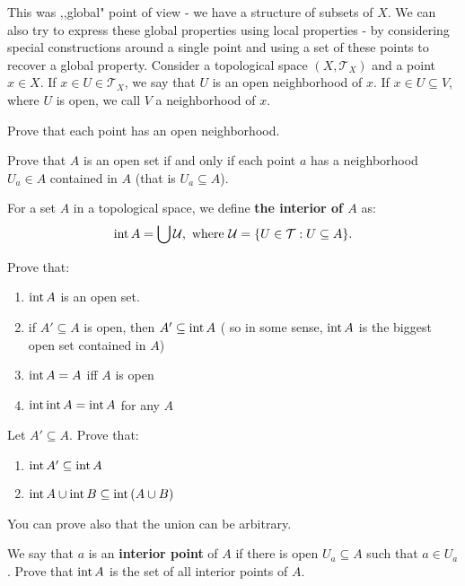 This was ,,global" point of view - we have a structure of subsets of $X$. We can also try to express these global properties using local
properties - by considering special constructions around a single point and using a set of these points to recover a global property.
Consider a topological space $(X,\mathcal T_X)$ and a point $x\in X$.
If $x\in U\in \mathcal T_X$, we say that $U$ is an open neighborhood
of $x$. If $x\in U\subseteq V$, where $U$ is open, we call $V$ a
neighborhood of $x$.

\begin{prob}
  Prove that each point has an open neighborhood.
\end{prob}

\begin{prob}
  Prove that $A$ is an open set if and only if each point $a$ has
  a neighborhood $U_a\in A$ contained in $A$
  (that is $U_a\subseteq A$).
\end{prob}

\noindent For a set $A$ in a topological space, we define \textbf{the
interior of $A$} as:
$$\text{int\,} A=\bigcup \mathcal U, \text{ where } \mathcal U = \{U\in \mathcal T : U\subseteq A \}.$$

\begin{prob}
  Prove that:
  \begin{enumerate}
    \item $\text{int\,} A$ is an open set.
    \item if $A'\subseteq A$ is open, then $A'\subseteq \text{int\,} A$ (
    so in some sense, $\text{int\,} A$ is the biggest open set contained in
    $A$)
    \item $\text{int\,} A = A$ iff $A$ is open
    \item $\text{int\,} \text{int\,} A = \text{int\,} A$ for any $A$
  \end{enumerate}
\end{prob}

\begin{prob}
  Let $A'\subseteq A$. Prove that:
  \begin{enumerate}
    \item $\text{int\,} A' \subseteq \text{int\,} A$
    \item $\text{int\,} A \cup \text{int\,} B\subseteq \text{int\,} (A\cup B)$
  \end{enumerate}
  You can prove also that the union can be arbitrary.
\end{prob}

\begin{prob}
	We say that $a$ is an \textbf{interior point} of $A$ if there is open $U_a\subseteq A$ such that $a\in U_a$. Prove that $\text{int\,} A$ is the set
	of all interior points of $A$.
\end{prob}

